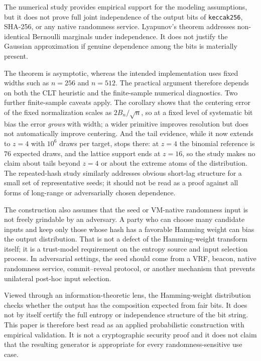 \documentclass[11pt]{article}
\begin{document}
The numerical study provides empirical support for the modeling assumptions, but
it does not prove full joint independence of the output bits of
\texttt{keccak256}, SHA-256, or any native randomness service. Lyapunov's
theorem addresses non-identical Bernoulli marginals under independence. It does
not justify the Gaussian approximation if genuine dependence among the bits is
materially present.

The theorem is asymptotic, whereas the intended implementation uses fixed widths
such as $n=256$ and $n=512$. The practical argument therefore depends on both
the CLT heuristic and the finite-sample numerical diagnostics. Two further
finite-sample caveats apply. The corollary shows that the centering error of
the fixed normalization scales as $2B_n/\sqrt{n}$, so at a fixed level of
systematic bit bias the error \emph{grows} with width; a wider primitive
improves resolution but does not automatically improve centering. And the
tail evidence, while it now extends to $z=4$ with $10^{6}$ draws per target,
stops there: at $z=4$ the binomial reference is $76$ expected draws, and the
lattice support ends at $z=16$, so the study makes no claim about tails
beyond $z=4$ or about the extreme atoms of the distribution. The repeated-hash study similarly addresses obvious
short-lag structure for a small set of representative seeds; it should not be
read as a proof against all forms of long-range or adversarially chosen
dependence.

The construction also assumes that the seed or VM-native randomness input is not
freely grindable by an adversary. A party who can choose many candidate inputs
and keep only those whose hash has a favorable Hamming weight can bias the
output distribution. That is not a defect of the Hamming-weight transform
itself; it is a trust-model requirement on the entropy source and input
selection process. In adversarial settings, the seed should come from a VRF,
beacon, native randomness service, commit--reveal protocol, or another mechanism
that prevents unilateral post-hoc input selection.

Viewed through an information-theoretic lens, the Hamming-weight distribution
checks whether the output has the composition expected from fair bits. It does
not by itself certify the full entropy or independence structure of the bit
string. This paper is therefore best read as an applied probabilistic
construction with empirical validation. It is not a cryptographic security
proof and it does not claim that the resulting generator is appropriate for
every randomness-sensitive use case.
\end{document}
